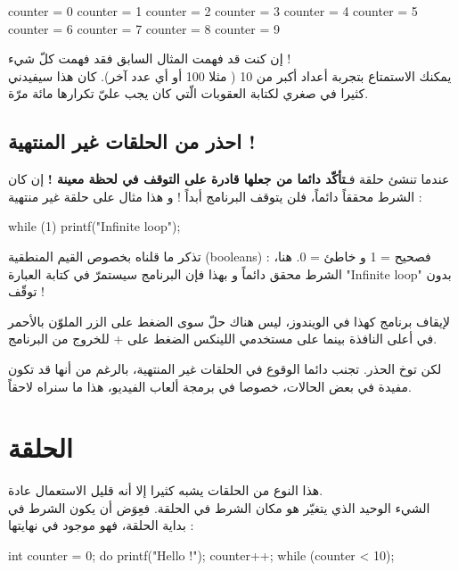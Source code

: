 \begin{Csource}
counter = 0
counter = 1
counter = 2
counter = 3
counter = 4
counter = 5
counter = 6
counter = 7
counter = 8
counter = 9
\end{Csource}

إن كنت قد فهمت المثال السابق فقد فهمت كلّ شيء !\\
يمكنك الاستمتاع بتجربة أعداد أكبر من 10 ( مثلا 100 أو أي عدد آخر). كان هذا سيفيدني كثيرا في صغري لكتابة العقوبات الّتي كان يجب عليّ تكرارها مائة مرّة.

\subsection{احذر من الحلقات غير المنتهية ! }

عندما تنشئ حلقة فـ\textbf{تأكّد دائما من جعلها قادرة على التوقف في لحظة معينة !}
إن كان الشرط محققاً دائماً، فلن يتوقف البرنامج أبداً ! و هذا مثال على حلقة غير منتهية :

\begin{Csource}
while (1)
{
	printf("Infinite loop\n");
}
\end{Csource}

تذكر ما قلناه بخصوص القيم المنطقية 
(\textenglish{booleans}) :
فصحيح = 1 و خاطئ = 0. هنا، الشرط محقق دائماً و بهذا فإن البرنامج سيستمرّ في كتابة العبارة 
"\textenglish{Infinite loop}"
بدون توقّف !

\begin{information}
لإيقاف برنامج كهذا في الويندوز، ليس هناك حلّ سوى الضغط على الزر 
الملوّن بالأحمر في أعلى النافذة بينما على مستخدمي اللينكس الضغط على
 + 
للخروج من البرنامج.
\end{information}
\textbf{\textbf{\textbf{}}}
لكن توخ الحذر. تجنب دائما الوقوع في الحلقات غير المنتهية، بالرغم من أنها قد تكون مفيدة في بعض الحالات، خصوصا في برمجة ألعاب الفيديو، هذا ما سنراه لاحقاً.

\section{الحلقة }

هذا النوع من الحلقات يشبه كثيرا 
إلا أنه قليل الاستعمال عادة.\\
الشيء الوحيد الذي يتغيّر هو مكان الشرط في الحلقة. فعِوَض أن يكون الشرط في بداية الحلقة، فهو موجود في نهايتها :

\begin{Csource}
int counter = 0;
do
{
	printf("Hello !\n");
	counter++;
} while (counter < 10);
\end{Csource}

